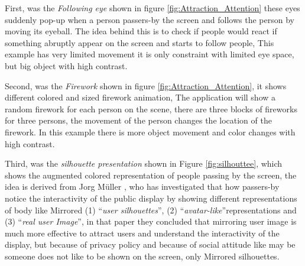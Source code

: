 First, was the \emph{Following eye} shown in figure  \ref{fig:Attraction_Attention} these eyes suddenly pop-up when a person passers-by the screen and follows the person by moving its eyeball. The idea behind this is to check if people would react if something abruptly appear on the screen and starts to follow people, This example has very limited movement it is only constraint with limited eye space, but big object with high contrast.

Second, was the \emph{Firework} shown in figure \ref{fig:Attraction_Attention}, it shows different colored and sized firework animation, The application will show a random firework for each person on the scene, there are three blocks of fireworks for three persons, the movement of the person changes the location of the firework. In this example there is more object movement and color changes with high contrast.

Third, was the \emph{silhouette presentation} shown in Figure \ref{fig:silhouttee}, which shows the augmented colored representation of people passing by the screen, the idea is derived from Jorg Müller \cite{LookingGlass}, who has investigated that how passers-by notice the interactivity of the public display by showing different representations of body like Mirrored (1) ``\emph{user silhouettes}'', (2) ``\emph{avatar-like}''representations and (3) ``\emph{real user Image}'', in that paper they concluded that mirroring user image is much more effective to attract users and understand the interactivity of the display, but because of privacy policy and because of social attitude like may be someone does not like to be shown on the screen, only Mirrored silhouettes.

